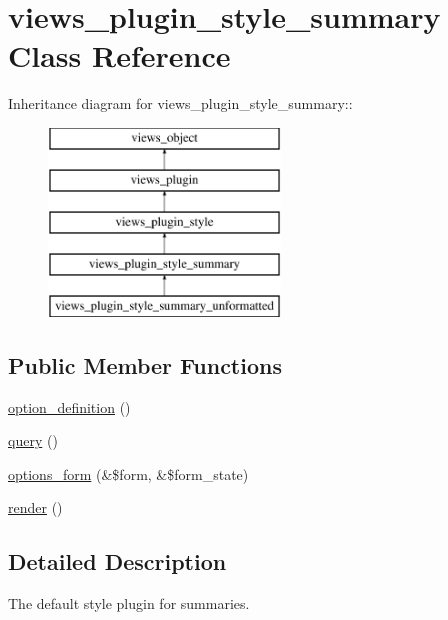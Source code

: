 \hypertarget{classviews__plugin__style__summary}{
\section{views\_\-plugin\_\-style\_\-summary Class Reference}
\label{classviews__plugin__style__summary}
}
Inheritance diagram for views\_\-plugin\_\-style\_\-summary::\begin{figure}[H]
\begin{center}
\leavevmode
\includegraphics[height=5cm]{classviews__plugin__style__summary}
\end{center}
\end{figure}
\subsection*{Public Member Functions}
\begin{CompactItemize}
\item 
\hyperlink{classviews__plugin__style__summary_7b016dd1af2076e3cf3199cede83d953}{option\_\-definition} ()
\item 
\hyperlink{classviews__plugin__style__summary_fd8f02a61bd0e1887cc7767950e8e0df}{query} ()
\item 
\hyperlink{classviews__plugin__style__summary_43826183b4d54242ae5276f40f70475f}{options\_\-form} (\&\$form, \&\$form\_\-state)
\item 
\hyperlink{classviews__plugin__style__summary_240be31b796b50331a25cf30818e584f}{render} ()
\end{CompactItemize}


\subsection{Detailed Description}
The default style plugin for summaries. 

